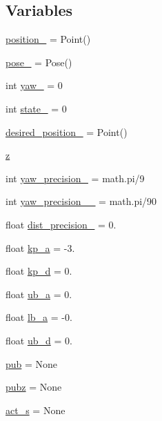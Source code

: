 \subsection*{Variables}
\begin{DoxyCompactItemize}
\item 
\hyperlink{namespacego__to__point__robot_acbca47166b9d5f046eaeadf1287f52c4}{position\+\_\+} = Point()
\item 
\hyperlink{namespacego__to__point__robot_a9ac7f45f0d64cf9ef7666d1f825ef9ba}{pose\+\_\+} = Pose()
\item 
int \hyperlink{namespacego__to__point__robot_af0544cdffc791a807b9062c979cf0c3d}{yaw\+\_\+} = 0
\item 
int \hyperlink{namespacego__to__point__robot_a68762504c0683adedb89a8f7d431f475}{state\+\_\+} = 0
\item 
\hyperlink{namespacego__to__point__robot_ab42eca5c5072ff7b4d95c8e13827dba7}{desired\+\_\+position\+\_\+} = Point()
\item 
\hyperlink{namespacego__to__point__robot_ad3b22a785c833ad2cdd10712a66f11c8}{z}
\item 
int \hyperlink{namespacego__to__point__robot_ad0131301589fb7d3d9462cff81932fcf}{yaw\+\_\+precision\+\_\+} = math.\+pi/9
\item 
int \hyperlink{namespacego__to__point__robot_aadcca20dfdd8e843623186e6efde0481}{yaw\+\_\+precision\+\_\+\_\+} = math.\+pi/90
\item 
float \hyperlink{namespacego__to__point__robot_adce474cb3bcc2782904a1e6129217a4c}{dist\+\_\+precision\+\_\+} = 0.
\item 
float \hyperlink{namespacego__to__point__robot_ab9bae8b08a7c50f11e55e3fae44f7777}{kp\+\_\+a} = -\/3.
\item 
float \hyperlink{namespacego__to__point__robot_afaac446f10588cd97bfda3bf31c3b670}{kp\+\_\+d} = 0.
\item 
float \hyperlink{namespacego__to__point__robot_a82aa92171409b5a766ecc7ec77f1488f}{ub\+\_\+a} = 0.
\item 
float \hyperlink{namespacego__to__point__robot_a0a5daf54d4f98b8898f69fc331bcc1f0}{lb\+\_\+a} = -\/0.
\item 
float \hyperlink{namespacego__to__point__robot_aa54f25328ab1ea2787c879431057298f}{ub\+\_\+d} = 0.
\item 
\hyperlink{namespacego__to__point__robot_a6e68302a4efb615222a73c01f4ea514e}{pub} = None
\item 
\hyperlink{namespacego__to__point__robot_ab0db118eb85d7bb034dfb80210d478be}{pubz} = None
\item 
\hyperlink{namespacego__to__point__robot_ab19ed2eba072e150275e059ca41a4cfc}{act\+\_\+s} = None
\end{DoxyCompactItemize}


